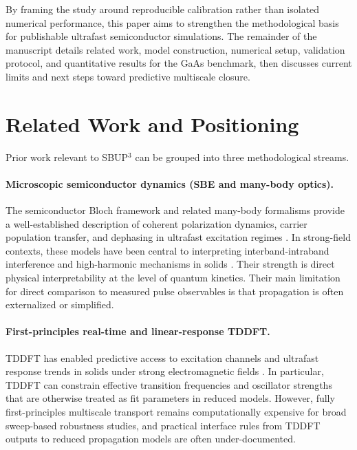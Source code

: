 \documentclass[aps,pra,twocolumn,reprint,superscriptaddress,nofootinbib]{revtex4-2}
\begin{document}
By framing the study around reproducible calibration rather than isolated
numerical performance, this paper aims to strengthen the methodological basis for
publishable ultrafast semiconductor simulations. The remainder of the manuscript
details related work, model construction, numerical setup, validation protocol,
and quantitative results for the GaAs benchmark, then discusses current limits
and next steps toward predictive multiscale closure.

\section{Related Work and Positioning}
Prior work relevant to SBUP$^3$ can be grouped into three methodological
streams.

\paragraph{Microscopic semiconductor dynamics (SBE and many-body optics).}
The semiconductor Bloch framework and related many-body formalisms provide a
well-established description of coherent polarization dynamics, carrier
population transfer, and dephasing in ultrafast excitation regimes
\cite{rossi2002ultrafast,axt2004femtosecond}. In strong-field contexts, these
models have been central to interpreting interband-intraband interference and
high-harmonic mechanisms in solids
\cite{golde2008hhg,vampa2014theoretical,vampa2015semiclassical}. Their strength
is direct physical interpretability at the level of quantum kinetics. Their
main limitation for direct comparison to measured pulse observables is that
propagation is often externalized or simplified.

\paragraph{First-principles real-time and linear-response TDDFT.}
TDDFT has enabled predictive access to excitation channels and ultrafast
response trends in solids under strong electromagnetic fields
\cite{yabana2012tddft,floss2018abinitio}. In particular, TDDFT can constrain
effective transition frequencies and oscillator strengths that are otherwise
treated as fit parameters in reduced models. However, fully first-principles
multiscale transport remains computationally expensive for broad sweep-based
robustness studies, and practical interface rules from TDDFT outputs to
reduced propagation models are often under-documented.
\end{document}
